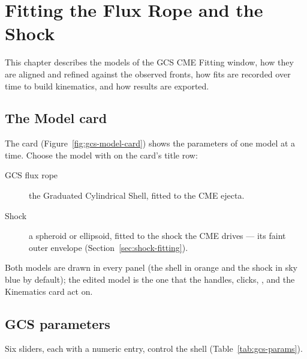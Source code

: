 \chapter{Fitting the Flux Rope and the Shock}
\label{ch:gcs-fitting}

This chapter describes the models of the GCS CME Fitting window, how they are aligned and
refined against the observed fronts, how fits are recorded over time to build kinematics, and
how results are exported.

\section{The Model card}

The  card (Figure~\ref{fig:gcs-model-card}) shows the parameters of one model at a
time. Choose the model with  on the card's title row:
\begin{description}
  \item[GCS flux rope] the Graduated Cylindrical Shell, fitted to the CME ejecta.
  \item[Shock] a spheroid or ellipsoid, fitted to the shock the CME drives --- its faint outer
    envelope (Section~\ref{sec:shock-fitting}).
\end{description}
Both models are drawn in every panel (the shell in orange and the shock in sky blue by
default); the edited model is the one that the handles, clicks, ,
 and the Kinematics card act on.


\section{GCS parameters}
\label{sec:gcs-parameters}

Six sliders, each with a numeric entry, control the shell (Table~\ref{tab:gcs-params}).

